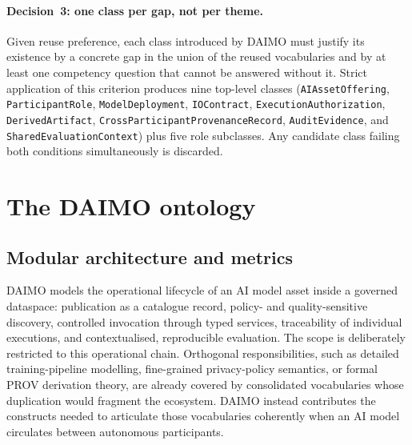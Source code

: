 \documentclass[Afour,sagev,times]{sagej}
\newcommand{\code}[1]{\texttt{#1}}
\begin{document}
\paragraph{Decision~3: one class per gap, not per theme.} Given reuse preference, each class introduced by DAIMO must justify its existence by a concrete gap in the union of the reused vocabularies and by at least one competency question that cannot be answered without it. Strict application of this criterion produces nine top-level classes (\code{AIAssetOffering}, \code{ParticipantRole}, \code{ModelDeployment}, \code{IOContract}, \code{ExecutionAuthorization}, \code{DerivedArtifact}, \code{CrossParticipantProvenanceRecord}, \code{AuditEvidence}, and \code{SharedEvaluationContext}) plus five role subclasses. Any candidate class failing both conditions simultaneously is discarded.

\section{The DAIMO ontology}\label{sec:ontology}

\subsection{Modular architecture and metrics}\label{sec:scope}

DAIMO models the operational lifecycle of an AI model asset inside a governed dataspace: publication as a catalogue record, policy- and quality-sensitive discovery, controlled invocation through typed services, traceability of individual executions, and contextualised, reproducible evaluation. The scope is deliberately restricted to this operational chain. Orthogonal responsibilities, such as detailed training-pipeline modelling, fine-grained privacy-policy semantics, or formal PROV derivation theory, are already covered by consolidated vocabularies whose duplication would fragment the ecosystem. DAIMO instead contributes the constructs needed to articulate those vocabularies coherently when an AI model circulates between autonomous participants.
\end{document}
